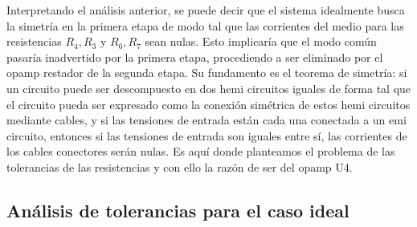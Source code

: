 \documentclass[../../tc_tp3_main.tex]{subfiles}
\begin{document}
 	Interpretando el análisis anterior, se puede decir que el sistema idealmente busca la simetría en la primera etapa de modo tal que las corrientes del medio para las resistencias $R_4, R_3$ y $R_6, R_7$ sean nulas. Esto implicaría que el modo común pasaría inadvertido por la primera etapa, procediendo a ser eliminado por el opamp restador de la segunda etapa. Su fundamento es el teorema de simetría: si un circuito puede ser descompuesto en dos hemi circuitos iguales de forma tal que el circuito pueda ser expresado como la conexión simétrica de estos hemi circuitos mediante cables, y si las tensiones de entrada están cada una conectada a un emi circuito, entonces si las tensiones de entrada son iguales entre sí, las corrientes de los cables conectores serán nulas. Es aquí donde planteamos el problema de las tolerancias de las resistencias y con ello la razón de ser del opamp U4.
 	
\subsection{Análisis de tolerancias para el caso ideal}
\end{document}
